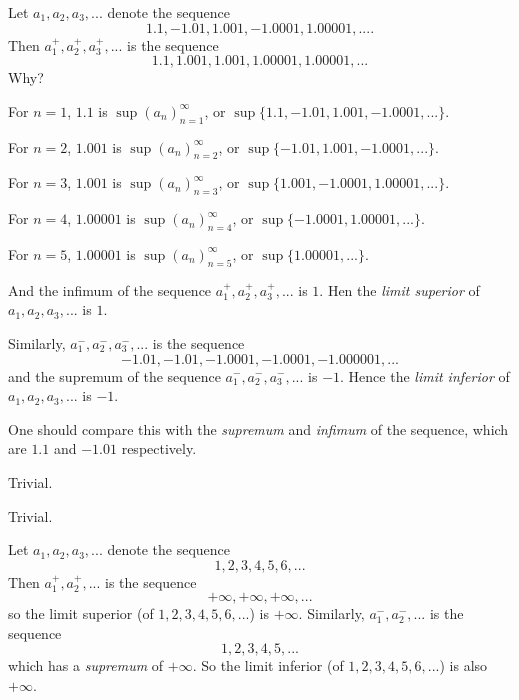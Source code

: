 \begin{example} \label{example 6.4.7}
Let \(a_1, a_2, a_3,...\) denote the sequence
\[
    1.1, -1.01, 1.001, -1.0001, 1.00001,....
\]
Then \(a_1^+, a_2^+, a_3^+, ...\) is the sequence
\[
    1.1, 1.001, 1.001, 1.00001, 1.00001,...
\]
Why?

For \(n = 1\), \(1.1\) is \(\sup(a_n)_{n = 1}^{\infty}\), or \(\sup \{1.1, -1.01, 1.001, -1.0001,...\} \).

For \(n = 2\), \(1.001\) is \(\sup(a_n)_{n = 2}^{\infty}\), or \(\sup \{-1.01, 1.001, -1.0001,... \}\).

For \(n = 3\), \(1.001\) is \(\sup(a_n)_{n = 3}^{\infty}\), or \(\sup \{1.001, -1.0001, 1.00001,...\}\).

For \(n = 4\), \(1.00001\) is \(\sup(a_n)_{n=4}^{\infty}\), or \(\sup \{-1.0001, 1.00001, ...\}\).

For \(n = 5\), \(1.00001\) is \(\sup(a_n)_{n = 5}^{\infty}\), or \(\sup \{1.00001, ...\}\).

And the infimum of the sequence \(a_1^+, a_2^+, a_3^+, ...\) is \(1\).
Hen the \emph{limit superior} of \(a_1, a_2, a_3,...\) is \(1\).

Similarly, \(a_1^-, a_2^-, a_3^- ,...\) is the sequence
\[
    -1.01, -1.01, -1.0001, -1.0001, -1.000001,...
\]
and the supremum of the sequence \(a_1^-, a_2^-, a_3^- ,...\) is \(-1\).
Hence the \emph{limit inferior} of \(a_1, a_2, a_3,...\) is \(-1\).

One should compare this with the \emph{supremum} and \emph{infimum} of the sequence, which are \(1.1\) and \(-1.01\) respectively.
\end{example}

\begin{example} \label{example 6.4.8}
Trivial.
\end{example}

\begin{example} \label{example 6.4.9}
Trivial.
\end{example}

\begin{example} \label{example 6.4.10}
Let \(a_1, a_2, a_3,...\) denote the sequence
\[
    1, 2, 3, 4, 5, 6,...
\]
Then \(a_1^+, a_2^+ ,...\) is the sequence
\[
    +\infty, +\infty, +\infty,...
\]
so the limit superior (of \(1, 2, 3, 4, 5, 6,...\)) is \(+\infty\).
Similarly, \(a_1^-, a_2^-, ...\) is the sequence
\[
    1, 2, 3, 4, 5,...
\]
which has a \emph{supremum} of \(+\infty\).
So the limit inferior (of \(1, 2, 3, 4, 5, 6,...\)) is also \(+\infty\).
\end{example}

